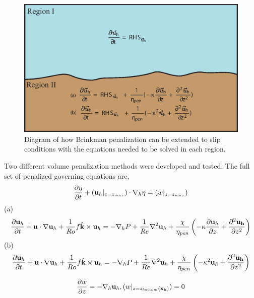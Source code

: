 \begin{center}
\begin{figure}[htp]
\centering
  \includegraphics[width=4 in]{Images/fluxdiagram.eps}
  \caption[Diagram of two formulations of extension of Brinkman to slip conditions]{Diagram of how Brinkman penalization can be extended to slip conditions with the equations needed to be solved in each region.}\label{f:fluxdiagram}
\end{figure}
\end{center}

Two different volume penalization methods were developed and tested.  The full set of penalized governing equations are, 
%
\begin{equation*}\label{e:seasurfaceheightpen2}
\frac{\partial \eta}{\partial t} + ({\bf u}_{h}|_{z=z_{max}}) \cdot \nabla_{h} \eta = (w|_{z=z_{max}})
\end{equation*}
(a)
\begin{equation*} \label{e:momentumpen2}
\frac{\partial {\bf u}_{h}}{\partial t} + {\bf u} \cdot \nabla {\bf u}_{h} + \frac{1}{Ro} f \hat{\bf k} \times {\bf u}_{h}= -\nabla_{h} P + \frac{1}{Re} \nabla ^{2} {\bf u}_{h} +   \frac{\chi}{\eta_{pen}} \left(-\kappa \frac{\partial {\bf u}_{h}}{\partial z} + \frac{\partial^{2} {\bf u_{h}}}{\partial z^{2}} \right)
\end{equation*}
(b)
\begin{equation*} \label{e:momentumpen2}
\frac{\partial {\bf u}_{h}}{\partial t} + {\bf u} \cdot \nabla {\bf u}_{h} + \frac{1}{Ro} f \hat{\bf k} \times {\bf u}_{h}= -\nabla_{h} P + \frac{1}{Re} \nabla ^{2} {\bf u}_{h} +  \frac{\chi}{\eta_{pen}} \left(-\kappa^{2} {\bf u}_{h} + \frac{\partial^{2} {\bf u_{h}}}{\partial z^{2}} \right)
\end{equation*}

\begin{equation*}\label{e:continuitypen2}
 \frac{\partial w}{\partial z} = - \nabla_{h}{\bf u}_{h}, (w|_{z=z_{bottom}({\bf x_{h}})})=0
\end{equation*}

